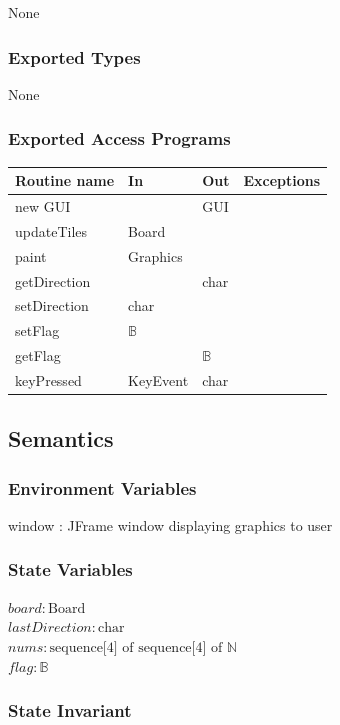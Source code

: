 \documentclass[12pt]{article}
\begin{document}
None

\subsubsection* {Exported Types}

None

\subsubsection* {Exported Access Programs}

\begin{tabular}{| l | l | l | p{5cm} |}
\hline
\textbf{Routine name} & \textbf{In} & \textbf{Out} & \textbf{Exceptions}\\
\hline
new GUI & & GUI & ~\\
\hline
updateTiles & Board & & ~\\
\hline
paint & Graphics & & ~\\
\hline
getDirection & & char &~\\
\hline
setDirection & char & &~\\
\hline
setFlag & $\mathbb{B}$ & & ~\\
\hline
getFlag & & $\mathbb{B}$ & ~\\
\hline
keyPressed & KeyEvent & char &~\\
\hline
\end{tabular}

\subsection* {Semantics}

\subsubsection*{Environment Variables}
window : JFrame window displaying graphics to user

\subsubsection* {State Variables}

$\mathit{board}: \text{Board}$\\
$\mathit{lastDirection}: \text{char}$ \\
$\mathit{nums}: \text{sequence[4] of sequence[4] of } \mathbb{N}$\\
$\mathit{flag}: \mathbb{B}$

\subsubsection* {State Invariant}
\end{document}
